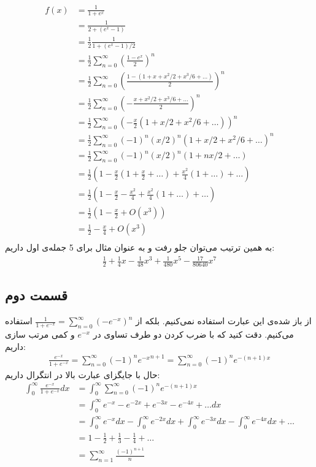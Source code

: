 \documentclass[]{article}
\begin{document}
\begin{align*}\\
    f(x)
    &=\frac{1}{1+e^x}\\
    &=\frac{1}{2+(e^x-1)}\\
    &=\frac12\frac{1}{1+(e^x-1)/2}\\
    &=\frac12\sum_{n=0}^{\infty}(\frac{1-e^x}{2})^n\\
    &=\frac12\sum_{n=0}^{\infty}(\frac{1-(1+x+x^2/2+x^3/6+\dots)}{2})^n\\
    &=\frac12\sum_{n=0}^{\infty}(-\frac{x+x^2/2+x^3/6+\dots}{2})^n\\
    &=\frac12\sum_{n=0}^{\infty}(-\frac{x}{2} (1+x/2+x^2/6+\dots))^n\\
    &=\frac12\sum_{n=0}^{\infty}(-1)^n(x/2)^n(1+x/2+x^2/6+\dots)^n\\
    &=\frac12\sum_{n=0}^{\infty}(-1)^n(x/2)^n(1+nx/2+\dots)\\
    &=\frac12\left(1-\frac{x}{2}(1+\frac{x}{2}+\dots)+\frac{x^2}{4}(1+\dots)+\dots\right)\\
    &=\frac12\left(1-\frac{x}{2}-\frac{x^2}{4} +\frac{x^2}{4}(1+\dots)+\dots\right)\\
    &=\frac12\left(1-\frac{x}{2}+O(x^3)\right)\\
    &=\frac12-\frac{x}{4}+O(x^3)\\
\end{align*}
به همین ترتیب می‌توان جلو رفت و به عنوان مثال برای 5 جمله‌ی اول داریم:
\begin{gather*}
    \boxed{\frac12+\frac{1}{4}x-\frac{1}{48}x^3 + \frac{1}{480}x^5 - \frac{17}{80640}x^7}
\end{gather*}
\subsection*{قسمت دوم}
از باز شده‌ی این عبارت استفاده نمی‌کنیم. بلکه از
$\frac{1}{1+e^{-x}} = \sum_{n=0}^{\infty} (-e^{-x})^n$
استفاده می‌کنیم. دقت کنید که با ضرب کردن دو طرف تساوی در
$e^{-x}$
و کمی مرتب سازی داریم:
\begin{gather*}
    \frac{e^{-x}}{1+e^{-x}} = \sum_{n=0}^{\infty} (-1)^n {e^{-x}}^{n+1} = \sum_{n=0}^{\infty} (-1)^n {e^{-(n+1)x}}
\end{gather*}
حال با جایگزای عبارت بالا در انتگرال داریم:
\begin{align*}
    \int_{0}^{\infty} \frac{e^{-x}}{1+e^{-x}} dx &= \int_{0}^{\infty} \sum_{n=0}^{\infty} (-1)^n {e^{-(n+1)x}}\\
    &= \int_{0}^{\infty} e^{-x} - e^{-2x} + e^{-3x} - e^{-4x} + \dots dx\\
    &= \int_{0}^{\infty} e^{-x} dx - \int_{0}^{\infty} e^{-2x} dx + \int_{0}^{\infty} e^{-3x} dx - \int_{0}^{\infty} e^{-4x} dx + \dots\\
    &= 1 - \frac{1}{2} + \frac{1}{3} - \frac{1}{4} + \dots\\
    &= \boxed{\sum_{n=1}^{\infty} \frac{(-1)^{n+1}}{n}}
\end{align*}
\end{document}
